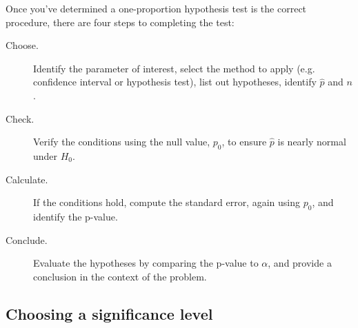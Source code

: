\begin{termBox}{
Once you've determined a one-proportion hypothesis test is the
correct procedure, there are four steps to completing the
test:
\begin{description}
\item[Choose.] Identify the parameter of interest,
    select the method to apply
    (e.g. confidence interval or hypothesis test),
    list out hypotheses,
    identify $\hat{p}$ and $n$.
\item[Check.] Verify the conditions using the null value,
    $p_0$, to ensure $\hat{p}$ is nearly normal under $H_0$.
\item[Calculate.] If the conditions hold, compute the standard
    error, again using $p_0$, and identify the p-value.
\item[Conclude.] Evaluate the hypotheses by comparing the p-value
    to $\alpha$, and provide a conclusion in the context of the
    problem.
\end{description}}
\end{termBox}







\subsection{Choosing a significance level}
\label{significanceLevel}


